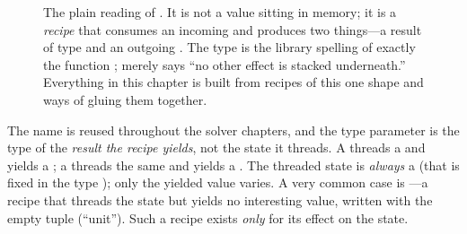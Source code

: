 \begin{figure}[t]
\centering
{}
\caption[\texttt{Solve a} as a state-threading recipe]{The plain reading of
. It is not a value sitting in memory; it is a \emph{recipe} that
consumes an incoming  and produces two things---a result of type
 and an outgoing . The type 
is the library spelling of exactly the function
;  merely says ``no other effect is
stacked underneath.'' Everything in this chapter is built from recipes of this one
shape and ways of gluing them together.}
\label{fig:solvetype}
\end{figure}

\begin{notationbox}
The name  is reused throughout the solver chapters, and the type
parameter  is the type of the \emph{result the recipe yields}, not the state
it threads. A  threads a  and yields a
; a  threads the same  and yields a
. The threaded state is \emph{always} a  (that is fixed in
the type ); only the yielded value varies.
A very common case is ---a recipe that threads the state but yields no
interesting value, written with the empty tuple \code{()} (``unit''). Such a recipe
exists \emph{only} for its effect on the state.
\end{notationbox}

